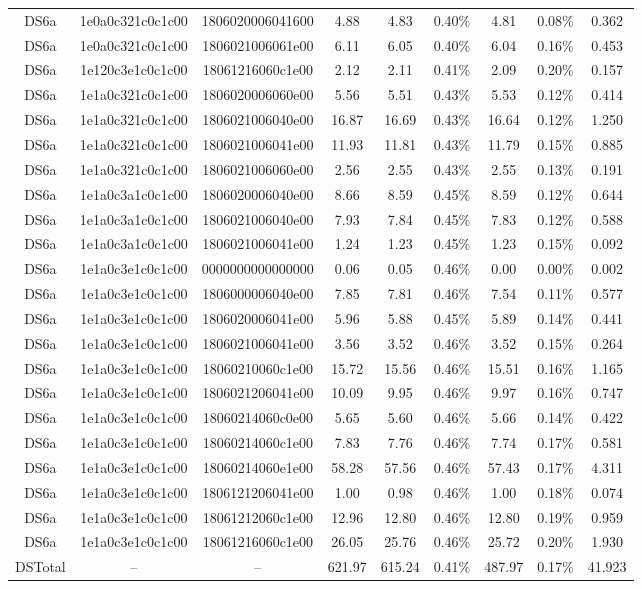 \begin{tabular}{|c|c c|c|c c|c c|c|}
  DS6a & 1e0a0c321c0c1c00 & 1806020006041600 & 4.88 & 4.83 & 0.40\% & 4.81 & 0.08\% & 0.362 \\
  DS6a & 1e0a0c321c0c1c00 & 1806021006061e00 & 6.11 & 6.05 & 0.40\% & 6.04 & 0.16\% & 0.453 \\
  DS6a & 1e120c3e1c0c1c00 & 18061216060c1e00 & 2.12 & 2.11 & 0.41\% & 2.09 & 0.20\% & 0.157 \\
  DS6a & 1e1a0c321c0c1c00 & 1806020006060e00 & 5.56 & 5.51 & 0.43\% & 5.53 & 0.12\% & 0.414 \\
  DS6a & 1e1a0c321c0c1c00 & 1806021006040e00 & 16.87 & 16.69 & 0.43\% & 16.64 & 0.12\% & 1.250 \\
  DS6a & 1e1a0c321c0c1c00 & 1806021006041e00 & 11.93 & 11.81 & 0.43\% & 11.79 & 0.15\% & 0.885 \\
  DS6a & 1e1a0c321c0c1c00 & 1806021006060e00 & 2.56 & 2.55 & 0.43\% & 2.55 & 0.13\% & 0.191 \\
  DS6a & 1e1a0c3a1c0c1c00 & 1806020006040e00 & 8.66 & 8.59 & 0.45\% & 8.59 & 0.12\% & 0.644 \\
  DS6a & 1e1a0c3a1c0c1c00 & 1806021006040e00 & 7.93 & 7.84 & 0.45\% & 7.83 & 0.12\% & 0.588 \\
  DS6a & 1e1a0c3a1c0c1c00 & 1806021006041e00 & 1.24 & 1.23 & 0.45\% & 1.23 & 0.15\% & 0.092 \\
  DS6a & 1e1a0c3e1c0c1c00 & 0000000000000000 & 0.06 & 0.05 & 0.46\% & 0.00 & 0.00\% & 0.002 \\
  DS6a & 1e1a0c3e1c0c1c00 & 1806000006040e00 & 7.85 & 7.81 & 0.46\% & 7.54 & 0.11\% & 0.577 \\
  DS6a & 1e1a0c3e1c0c1c00 & 1806020006041e00 & 5.96 & 5.88 & 0.45\% & 5.89 & 0.14\% & 0.441 \\
  DS6a & 1e1a0c3e1c0c1c00 & 1806021006041e00 & 3.56 & 3.52 & 0.46\% & 3.52 & 0.15\% & 0.264 \\
  DS6a & 1e1a0c3e1c0c1c00 & 18060210060c1e00 & 15.72 & 15.56 & 0.46\% & 15.51 & 0.16\% & 1.165 \\
  DS6a & 1e1a0c3e1c0c1c00 & 1806021206041e00 & 10.09 & 9.95 & 0.46\% & 9.97 & 0.16\% & 0.747 \\
  DS6a & 1e1a0c3e1c0c1c00 & 18060214060c0e00 & 5.65 & 5.60 & 0.46\% & 5.66 & 0.14\% & 0.422 \\
  DS6a & 1e1a0c3e1c0c1c00 & 18060214060c1e00 & 7.83 & 7.76 & 0.46\% & 7.74 & 0.17\% & 0.581 \\
  DS6a & 1e1a0c3e1c0c1c00 & 18060214060e1e00 & 58.28 & 57.56 & 0.46\% & 57.43 & 0.17\% & 4.311 \\
  DS6a & 1e1a0c3e1c0c1c00 & 1806121206041e00 & 1.00 & 0.98 & 0.46\% & 1.00 & 0.18\% & 0.074 \\
  DS6a & 1e1a0c3e1c0c1c00 & 18061212060c1e00 & 12.96 & 12.80 & 0.46\% & 12.80 & 0.19\% & 0.959 \\
  DS6a & 1e1a0c3e1c0c1c00 & 18061216060c1e00 & 26.05 & 25.76 & 0.46\% & 25.72 & 0.20\% & 1.930 \\
  DSTotal & -- & -- & 621.97 & 615.24 & 0.41\% & 487.97 & 0.17\% & 41.923 \\
\hline
\end{tabular}
